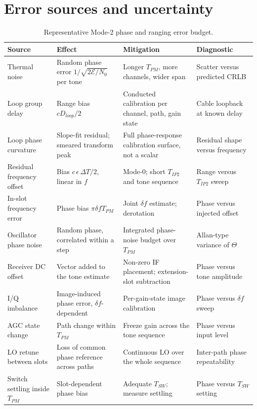 \documentclass[11pt,a4paper]{article}
\newcommand{\Tsw}{T_{SW}}
\newcommand{\Tpm}{T_{PM}}
\newcommand{\Tipp}{T_{IP2}}
\begin{document}
\section{Error sources and uncertainty}

\begin{table}[h]
\caption{Representative Mode-2 phase and ranging error budget.}
\label{tab:errors}
\centering\small
\begin{tabular}{@{}L{30mm}L{34mm}L{34mm}L{30mm}@{}}
\toprule
Source & Effect & Mitigation & Diagnostic \\
\midrule
Thermal noise & Random phase error $1/\sqrt{2\mathcal{E}/N_0}$ per tone & Longer $\Tpm$, more channels, wider span & Scatter versus predicted CRLB \\
Loop group delay & Range bias $c D_{loop}/2$ & Conducted calibration per channel, path, gain state & Cable loopback at known delay \\
Loop phase curvature & Slope-fit residual; smeared transform peak & Full phase-response calibration surface, not a scalar & Residual shape versus frequency \\
Residual frequency offset & Bias $c\,\epsilon\,\Delta T/2$, linear in $f$ & Mode-0; short $\Tipp$ and tone sequence & Range versus $\Tipp$ sweep \\
In-slot frequency error & Phase bias $\pi\delta f\Tpm$ & Joint $\delta f$ estimate; derotation & Phase versus injected offset \\
Oscillator phase noise & Random phase, correlated within a step & Integrated phase-noise budget over $\Tpm$ & Allan-type variance of $\Theta$ \\
Receiver DC offset & Vector added to the tone estimate & Non-zero IF placement; extension-slot subtraction & Phase versus tone amplitude \\
I/Q imbalance & Image-induced phase error, $\delta f$-dependent & Per-gain-state image calibration & Phase versus $\delta f$ sweep \\
AGC state change & Path change within $\Tpm$ & Freeze gain across the tone sequence & Phase versus input level \\
LO retune between slots & Loss of common phase reference across paths & Continuous LO over the whole sequence & Inter-path phase repeatability \\
Switch settling inside $\Tpm$ & Slot-dependent phase bias & Adequate $\Tsw$; measure settling & Phase versus $\Tsw$ setting \\

\end{tabular}
\end{table}
\end{document}
